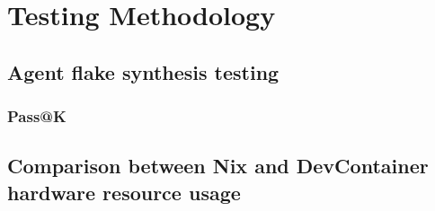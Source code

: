 \chapter{Testing Methodology}\label{chap:testing}

\section{Agent flake synthesis testing}

\subsection{Pass@K}

\section{Comparison between Nix and DevContainer hardware resource usage}

